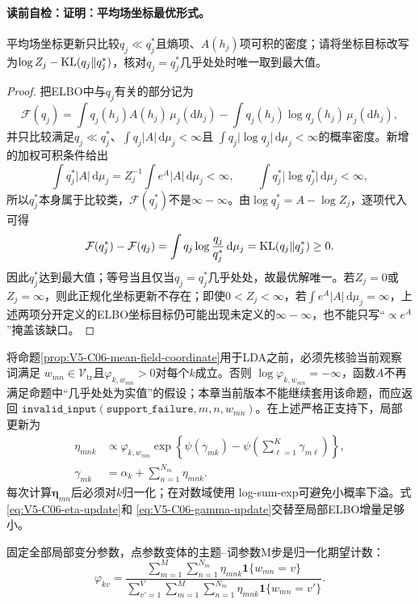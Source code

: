 \paragraph{读前自检：证明：平均场坐标最优形式。}平均场坐标更新只比较$q_j\ll q_j^*$且熵项、$A(h_j)$项可积的密度；请将坐标目标改写为$\log Z_j-\operatorname{KL}(q_j\|q_j^*)$，核对$q_j=q_j^*$几乎处处时唯一取到最大值。\par

\begin{proof}
把ELBO中与$q_j$有关的部分记为
\[
\mathcal F(q_j)=\int q_j(h_j)A(h_j)\,\mu_j(\mathrm dh_j)
-\int q_j(h_j)\log q_j(h_j)\,\mu_j(\mathrm dh_j),
\]
并只比较满足$q_j\ll q_j^*$、$\int q_j\lvert A\rvert\,\mathrm d\mu_j<\infty$且
$\int q_j\lvert\log q_j\rvert\,\mathrm d\mu_j<\infty$的概率密度。新增的加权可积条件给出
\[
\int q_j^*\lvert A\rvert\,\mathrm d\mu_j
=Z_j^{-1}\int e^A\lvert A\rvert\,\mathrm d\mu_j<\infty,
\qquad
\int q_j^*\lvert\log q_j^*\rvert\,\mathrm d\mu_j<\infty,
\]
所以$q_j^*$本身属于比较类，$\mathcal F(q_j^*)$不是$\infty-\infty$。由$\log q_j^*=A-\log Z_j$，逐项代入可得
\[
\mathcal F(q_j^*)-\mathcal F(q_j)
=\int q_j\log\frac{q_j}{q_j^*}\,\mathrm d\mu_j
=\operatorname{KL}(q_j\|q_j^*)\ge0.
\]
因此$q_j^*$达到最大值；等号当且仅当$q_j=q_j^*$几乎处处，故最优解唯一。若$Z_j=0$或$Z_j=\infty$，则此正规化坐标更新不存在；即使$0<Z_j<\infty$，若$\int e^A\lvert A\rvert\,\mathrm d\mu_j=\infty$，上述两项分开定义的ELBO坐标目标仍可能出现未定义的$\infty-\infty$，也不能只写“$\propto e^A$”掩盖该缺口。
\end{proof}

将命题\ref{prop:V5-C06-mean-field-coordinate}用于LDA之前，必须先核验当前观察词满足
$w_{mn}\in\mathcal V_{\mathrm{tr}}$且$\varphi_{k,w_{mn}}>0$对每个$k$成立。否则
$\log\varphi_{k,w_{mn}}=-\infty$，函数$A$不再满足命题中“几乎处处为实值”的假设；本章当前版本不能继续套用该命题，而应返回
$\mathtt{invalid\_input}(\mathtt{support\_failure},m,n,w_{mn})$。在上述严格正支持下，局部更新为
\begin{align}
\eta_{mnk}
&\propto \varphi_{k,w_{mn}}
\exp\!\left\{\psi(\gamma_{mk})-
\psi\!\left(\sum_{\ell=1}^{K}\gamma_{m\ell}\right)\right\},
\label{eq:V5-C06-eta-update}\\
\gamma_{mk}
&=\alpha_k+\sum_{n=1}^{N_m}\eta_{mnk}.
\label{eq:V5-C06-gamma-update}
\end{align}
每次计算$\boldsymbol\eta_{mn}$后必须对$k$归一化；在对数域使用
log-sum-exp可避免小概率下溢。式\eqref{eq:V5-C06-eta-update}和
\eqref{eq:V5-C06-gamma-update}交替至局部ELBO增量足够小。

固定全部局部变分参数，点参数变体的主题--词参数M步是归一化期望计数：
\begin{equation}
\varphi_{kv}
=\frac{\displaystyle\sum_{m=1}^{M}\sum_{n=1}^{N_m}
\eta_{mnk}\mathbf1\{w_{mn}=v\}}
{\displaystyle\sum_{v'=1}^{V}\sum_{m=1}^{M}\sum_{n=1}^{N_m}
\eta_{mnk}\mathbf1\{w_{mn}=v'\}}.
\label{eq:V5-C06-phi-update}
\end{equation}


